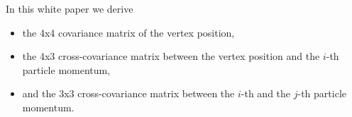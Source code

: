 
In this white paper we derive
\begin{itemize}
    \item the 4x4 covariance matrix of the vertex position,
    \item the 4x3 cross-covariance matrix between the vertex position and the $i$-th particle momentum,
    \item and the 3x3 cross-covariance matrix between the $i$-th and the $j$-th particle momentum.
\end{itemize}